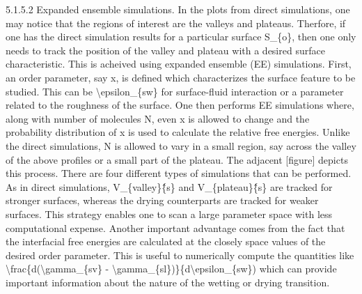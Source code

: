\par 5.1.5.2 Expanded ensemble simulations. In the plots from direct simulations, one may notice that the regions of interest are the valleys and plateaus. Therfore, if one has the direct simulation results for a particular surface S\_\{o\}, then one only needs to track the position of the valley and plateau with a desired surface characteristic. This is acheived using expanded ensemble (EE) simulations. First, an order parameter, say x, is defined which characterizes the surface feature to be studied. This can be \textbackslash epsilon\_\{sw\} for surface-fluid interaction or a parameter related to the roughness of the surface. One then performs EE simulations where, along with number of molecules N, even x is allowed to change and the probability distribution of x is used to calculate the relative free energies. Unlike the direct simulations, N is allowed to vary in a small region, say across the valley of the above profiles or a small part of the plateau. The adjacent [figure] depicts this process. There are four different types of simulations that can be performed. As in direct simulations, V\_\{valley\}\^\{s\} and V\_\{plateau\}\^\{s\} are tracked for stronger surfaces, whereas the drying counterparts are tracked for weaker surfaces. This strategy enables one to scan a large parameter space with less computational expense. Another important advantage comes from the fact that the interfacial free energies are calculated at the closely space values of the desired order parameter. This is useful to numerically compute the quantities like \textbackslash frac\{d(\textbackslash gamma\_\{sv\} - \textbackslash gamma\_\{sl\})\}\{d\textbackslash epsilon\_\{sw\}) which can provide important information about the nature of the wetting or drying transition.
